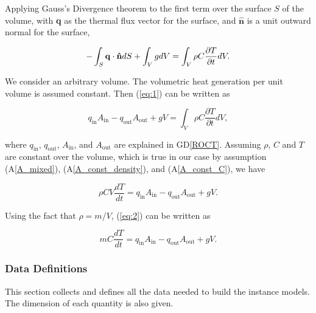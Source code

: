 \documentclass[12pt]{article}
\newcommand{\dref}[1]{GD\ref{#1}}
\newcommand{\aref}[1]{A\ref{#1}}
\begin{document}
\noindent
Applying Gauss's Divergence theorem to the first term over the surface $S$ of
the volume, with
\textbf{q} as the thermal flux vector for the surface, and {$\mathbf{\hat n}$} is
a unit outward normal for the surface,

\begin{equation}
-\int_S{ \bf{q\cdot \hat n}} dS+\int_V g dV= \int_V \rho C \frac{\partial T}{\partial t}dV. \label{eq:1}
\end{equation}

\noindent
We consider an arbitrary volume.  The volumetric heat generation per unit volume is assumed
constant.  Then (\ref{eq:1}) can be written as


\begin{equation*}
  q_{\mathrm{in}} A_{\mathrm{in}} - q_{\mathrm{out}} A_{\mathrm{out}} + g V = \int_V \rho C \frac{\partial T}{\partial t}dV,
\end{equation*}

\noindent where $q_{\mathrm{in}}$, $q_{\mathrm{out}}$, $A_{\mathrm{in}}$, and 
$A_{\mathrm{out}}$ are explained in \dref{ROCT}.  Assuming $\rho$, $C$ and $T$ are
constant over the volume, which is true in our case by assumption (\aref{A_mixed}),
(\aref{A_const_density}), and (\aref{A_const_C}), we have

\begin{equation}
\rho C V\frac{dT}{dt} = q_{\mathrm{in}} A_{\mathrm{in}} - q_{\mathrm{out}} A_{\mathrm{out}} + g V. \label{eq:2}
\end{equation}

\noindent
Using the fact that $\rho = {m}/{V}$, (\ref{eq:2}) can be written as

\begin{equation*}
m C \frac{dT}{dt} = q_{\mathrm{in}} A_{\mathrm{in}} - q_{\mathrm{out}} A_{\mathrm{out}} + g V.
\end{equation*}

\subsubsection{Data Definitions}\label{sec_datadef}

This section collects and defines all the data needed to build the instance
models. The dimension of each quantity is also given.
\end{document}

